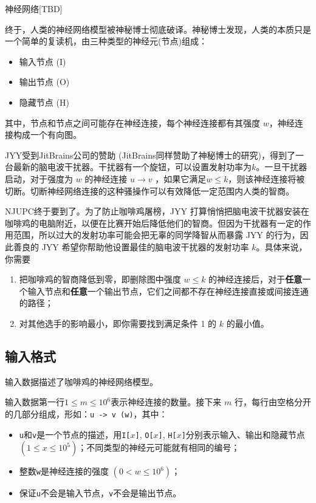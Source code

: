 \begin{Problem}{神经网络}{[TBD]}

终于，人类的神经网络模型被神秘博士彻底破译。神秘博士发现，人类的本质只是一个简单的复读机，由三种类型的神经元(节点)组成：

\begin{itemize}
\item 输入节点 (I)
\item 输出节点 (O)
\item 隐藏节点 (H)
\end{itemize}

其中，节点和节点之间可能存在神经连接，每个神经连接都有其强度 $w$，神经连接构成一个有向图。

JYY受到JitBrains公司的赞助 (JitBrains同样赞助了神秘博士的研究)，得到了一台最新的脑电波干扰器。干扰器有一个旋钮，可以设置发射功率为$k$。一旦干扰器启动，对于强度为 $w$ 的神经连接 $u \to v$ ，如果它满足$w \le k$，则该神经连接将被切断。切断神经网络连接的这种骚操作可以有效降低一定范围内人类的智商。

NJUPC终于要到了。为了防止咖啡鸡屠榜，JYY 打算悄悄把脑电波干扰器安装在咖啡鸡的电脑附近，以便在比赛开始后降低他们的智商。但因为干扰器有一定的作用范围，所以过大的发射功率可能会把无辜的同学降智从而暴露 JYY 的行为，因此善良的 JYY 希望你帮助他设置最佳的脑电波干扰器的发射功率 $k$。具体来说，你需要

\begin{enumerate}
\item 把咖啡鸡的智商降低到零，即删除图中强度 $w \le k$ 的神经连接后，对于\textbf{任意}一个输入节点和\textbf{任意}一个输出节点，它们之间都不存在神经连接直接或间接连通的路径；
\item 对其他选手的影响最小，即你需要找到满足条件 1 的 $k$ 的最小值。
\end{enumerate}

\subsection*{输入格式}

输入数据描述了咖啡鸡的神经网络模型。

输入数据第一行$1\le m \le 10^6$表示神经连接的数量。接下来 $m$ 行，每行由空格分开的几部分组成，形如：\texttt{u -> v (w)}，其中：

\begin{itemize}
\item \texttt{u}和\texttt{v}是一个节点的描述，用\texttt{I[$x$]}, \texttt{O[$x$]}, \texttt{H[$x$]}分别表示输入、输出和隐藏节点 $(1 \le x \le 10^5)$；不同类型的神经元可能就有相同的编号；
\item 整数\texttt{w}是神经连接的强度 $(0 < w \le 10^6)$；
\item 保证\texttt{u}不会是输入节点，\texttt{v}不会是输出节点。
\end{itemize}



\end{Problem}
